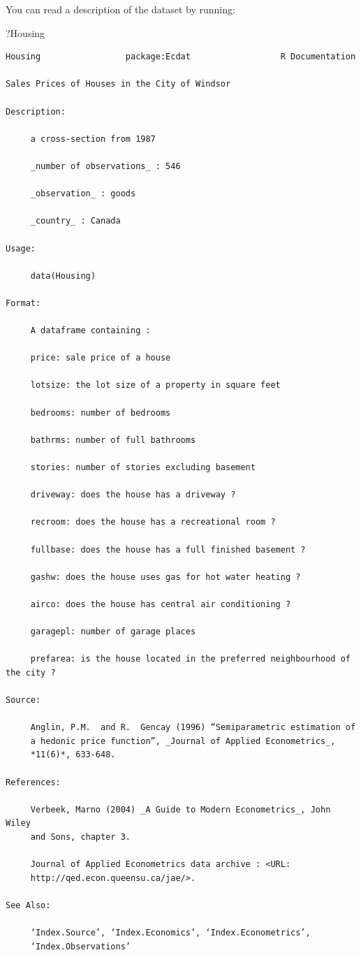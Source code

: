 \documentclass[]{gitbook}
\newenvironment{Shaded}{\begin{snugshade}}{\end{snugshade}}
\newcommand{\NormalTok}[1]{#1}
\theoremstyle{definition}
\theoremstyle{definition}
\theoremstyle{definition}
\theoremstyle{remark}
\begin{document}
You can read a description of the dataset by running:

\begin{Shaded}
\begin{Highlighting}[]
\NormalTok{?Housing}
\end{Highlighting}
\end{Shaded}

\begin{verbatim}
Housing                 package:Ecdat                  R Documentation

Sales Prices of Houses in the City of Windsor

Description:

     a cross-section from 1987

     _number of observations_ : 546

     _observation_ : goods

     _country_ : Canada

Usage:

     data(Housing)

Format:

     A dataframe containing :

     price: sale price of a house

     lotsize: the lot size of a property in square feet

     bedrooms: number of bedrooms

     bathrms: number of full bathrooms

     stories: number of stories excluding basement

     driveway: does the house has a driveway ?

     recroom: does the house has a recreational room ?

     fullbase: does the house has a full finished basement ?

     gashw: does the house uses gas for hot water heating ?

     airco: does the house has central air conditioning ?

     garagepl: number of garage places

     prefarea: is the house located in the preferred neighbourhood of the city ?

Source:

     Anglin, P.M.  and R.  Gencay (1996) “Semiparametric estimation of
     a hedonic price function”, _Journal of Applied Econometrics_,
     *11(6)*, 633-648.

References:

     Verbeek, Marno (2004) _A Guide to Modern Econometrics_, John Wiley
     and Sons, chapter 3.

     Journal of Applied Econometrics data archive : <URL:
     http://qed.econ.queensu.ca/jae/>.

See Also:

     ‘Index.Source’, ‘Index.Economics’, ‘Index.Econometrics’,
     ‘Index.Observations’
\end{verbatim}
\end{document}
